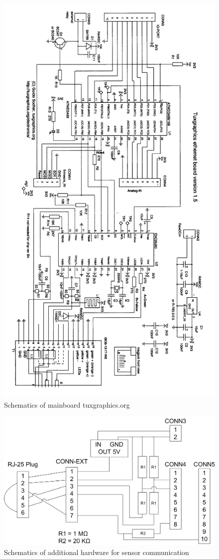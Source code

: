 \begin{figure}[H]
    \centering
    \includegraphics[width=0.7\linewidth]{graphics/schematics1.png}
    \caption{Schematics of mainboard \copy tuxgraphics.org}
    \label{fig:mainboard_schematic1}
\end{figure}

\begin{figure}[H]
    \centering
    \includegraphics[width=\linewidth]{graphics/schematics.png}
    \caption{Schematics of additional hardware for sensor communication}
    \label{fig:mainboard_schematic}
\end{figure}

